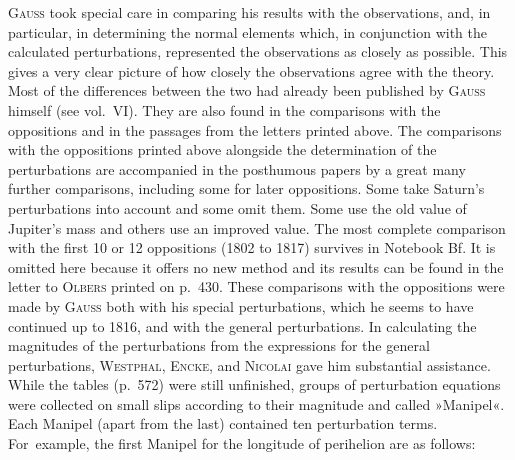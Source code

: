 \par\noindent\hspace*{\parindent}\textsc{Gauss} took special care in comparing his results with the observations,
and, in particular, in determining the normal elements which, in conjunction with the calculated perturbations, represented the
observations as closely as possible. This gives a very clear picture of
how closely the observations agree with the theory. Most of the differences between the two
had already been published by \textsc{Gauss} himself (see vol.~VI). They are also found in the comparisons
with the oppositions and in the passages from the letters printed above. The comparisons with the oppositions
printed above alongside the determination of the perturbations are accompanied in the posthumous papers by
a great many further comparisons, including some for later oppositions. Some take Saturn's perturbations into account
and some omit them. Some use the old value of Jupiter's mass and others use an improved value.
The most complete comparison with the first 10 or 12 oppositions (1802 to 1817) survives in Notebook
Bf. It is omitted here because it offers no new method and its
results can be found in the letter to \textsc{Olbers} printed on p.~430. These comparisons with the oppositions
were made by \textsc{Gauss} both with his special perturbations, which he seems to have continued up to 1816,
and with the general perturbations. In calculating the magnitudes of the perturbations from
the expressions for the general perturbations, \textsc{Westphal}, \textsc{Encke}, and \textsc{Nicolai} gave him substantial
assistance. While the tables (p.~572) were still unfinished, groups of perturbation equations
were collected on small slips according to their magnitude and called »Manipel«. Each Manipel
(apart from the last) contained ten perturbation terms. For~example, the first Manipel for the
longitude of perihelion are as follows:

